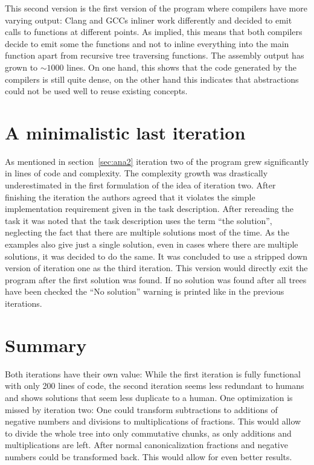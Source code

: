 \documentclass[11pt,a4paper]{article}
\begin{document}
This second version is the first version of the program where
compilers have more varying output: Clang and GCCs inliner work
differently and decided to emit calls to functions at different
points. As implied, this means that both compilers decide to
emit some the functions and not to inline everything into the main
function apart from recursive tree traversing functions.
The assembly output has grown to $\sim 1000$ lines. On one hand, this
shows that the code generated by the compilers is still quite dense,
on the other hand this indicates that abstractions could not be used
well to reuse existing concepts.

\section {A minimalistic last iteration}

As mentioned in section~\ref{sec:ana2} iteration two of the program
grew significantly in lines of code and complexity.
The complexity growth was drastically underestimated in the first
formulation of the idea of iteration two.
After finishing the iteration the authors agreed that it violates the
simple implementation requirement given in the task description.
After rereading the task it was noted that the task description uses
the term ``the solution'', neglecting the fact that there are multiple
solutions most of the time.
As the examples also give just a single solution, even in cases where
there are multiple solutions, it was decided to do the same.
It was concluded to use a stripped down version of iteration one as
the third iteration.
This version would directly exit the program after the first solution
was found.
If no solution was found after all trees have been checked the ``No
solution'' warning is printed like in the previous iterations.

\section{Summary}

Both iterations have their own value:
While the first iteration is fully functional with only 200 lines of
code, the second iteration seems less redundant to humans and shows
solutions that seem less duplicate to a human.
One optimization is missed by iteration two: One could transform
subtractions to additions of negative numbers and divisions to
multiplications of fractions.
This would allow to divide the whole tree into only commutative
chunks, as only additions and multiplications are left.
After normal canonicalization fractions and negative numbers could be
transformed back.
This would allow for even better results.
\end{document}
